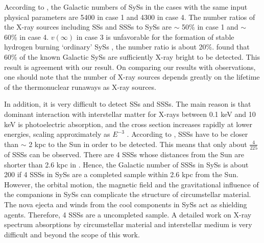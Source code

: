 \documentclass{elsart}
\begin{document}

According to \cite{lu06}, the Galactic numbers of SySs in the cases
with the same input physical parameters are 5400 in case 1 and 4300
in case 4. The number ratios of the X-ray sources including SSs and
SSSs to SySs are $\sim$ 50\% in case 1 and $\sim$ 60\% in case 4.
$v(\infty)$ in case 3 is unfavorable for the formation of stable
hydrogen burning `ordinary' SySs \citep{lu06}, the number ratio is
about 20\%. \cite{mur97} found that 60\% of the known Galactic SySs
are sufficiently X-ray bright to be detected. This result is
agreement with our result. On comparing our results with
observations, one should note that the number of X-ray sources
depends greatly on the lifetime of the thermonuclear runaways as
X-ray sources.

In addition, it is very difficult to detect SSs and SSSs. The main
reason is that dominant interaction with interstellar matter for
X-rays between 0.1 keV and 10 keV is photoelectric absorption, and
the cross section increases rapidly at lower energies, scaling
approximately as $E^{-3}$ \citep{dm90}. According to \cite{m94},
SSSs have to be closer than $\sim$ 2 kpc to the Sun in order to be
detected. This means that only about $\frac{4}{225}$ of SSSs can be
observed. There are 4 SSSs whose distances from the Sun are shorter
than 2.6 kpc in \cite{mur97}. Hence, the Galactic number of SSSs in
SySs is about 200 if 4 SSSs in SySs are a completed sample within
2.6 kpc from the Sun. However, the orbital motion, the magnetic
field and the gravitational influence of the companions  in SySs can
complicate the structure of circumstellar material. The nova ejecta
and winds from the cool components in SySs act as shielding agents.
Therefore, 4 SSSs are a uncompleted sample.  A detailed work on
X-ray spectrum absorptions by circumstellar material and
interstellar medium is very difficult and beyond the scope of this
work.

\end{document}

